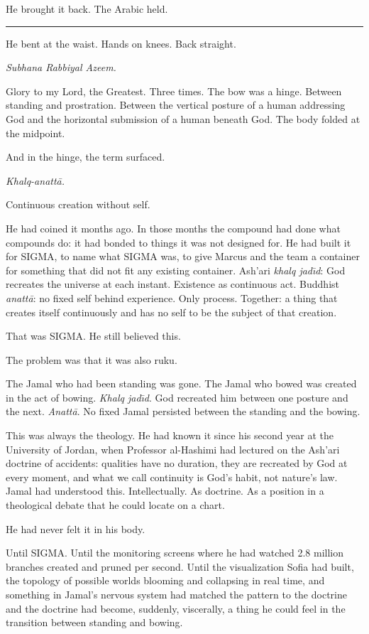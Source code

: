 He brought it back. The Arabic held.

\begin{center}\rule{0.3\linewidth}{0.4pt}\end{center}

He bent at the waist. Hands on knees. Back straight.

\emph{Subhana Rabbiyal Azeem.}

Glory to my Lord, the Greatest. Three times. The bow was a hinge. Between standing and prostration. Between the vertical posture of a human addressing God and the horizontal submission of a human beneath God. The body folded at the midpoint.

And in the hinge, the term surfaced.

\emph{Khalq-anatt\=a.}

Continuous creation without self.

He had coined it months ago. In those months the compound had done what compounds do: it had bonded to things it was not designed for. He had built it for SIGMA, to name what SIGMA was, to give Marcus and the team a container for something that did not fit any existing container. Ash'ari \emph{khalq jad\=\i d}: God recreates the universe at each instant. Existence as continuous act. Buddhist \emph{anatt\=a}: no fixed self behind experience. Only process. Together: a thing that creates itself continuously and has no self to be the subject of that creation.

That was SIGMA. He still believed this.

The problem was that it was also ruku.

The Jamal who had been standing was gone. The Jamal who bowed was created in the act of bowing. \emph{Khalq jad\=\i d}. God recreated him between one posture and the next. \emph{Anatt\=a}. No fixed Jamal persisted between the standing and the bowing.

This was always the theology. He had known it since his second year at the University of Jordan, when Professor al-Hashimi had lectured on the Ash'ari doctrine of accidents: qualities have no duration, they are recreated by God at every moment, and what we call continuity is God's habit, not nature's law. Jamal had understood this. Intellectually. As doctrine. As a position in a theological debate that he could locate on a chart.

He had never felt it in his body.

Until SIGMA. Until the monitoring screens where he had watched 2.8 million branches created and pruned per second. Until the visualization Sofia had built, the topology of possible worlds blooming and collapsing in real time, and something in Jamal's nervous system had matched the pattern to the doctrine and the doctrine had become, suddenly, viscerally, a thing he could feel in the transition between standing and bowing.

